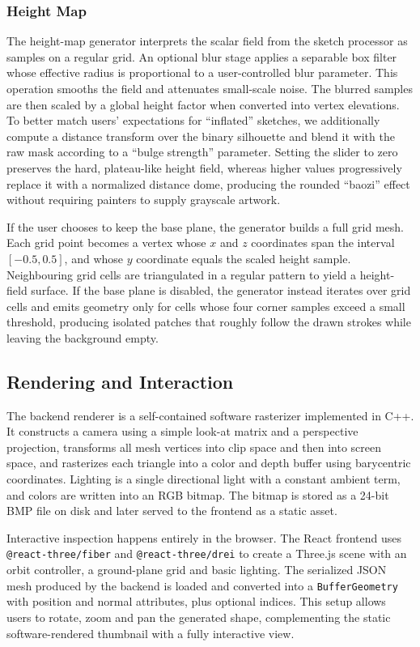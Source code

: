 \documentclass[11pt, a4paper]{article}
\begin{document}
\subsubsection{Height Map}
The height-map generator interprets the scalar field from the sketch processor as samples on a regular grid. An optional blur stage applies a separable box filter whose effective radius is proportional to a user-controlled blur parameter. This operation smooths the field and attenuates small-scale noise. The blurred samples are then scaled by a global height factor when converted into vertex elevations. To better match users' expectations for ``inflated'' sketches, we additionally compute a distance transform over the binary silhouette and blend it with the raw mask according to a ``bulge strength'' parameter. Setting the slider to zero preserves the hard, plateau-like height field, whereas higher values progressively replace it with a normalized distance dome, producing the rounded ``baozi'' effect without requiring painters to supply grayscale artwork.

If the user chooses to keep the base plane, the generator builds a full grid mesh. Each grid point becomes a vertex whose $x$ and $z$ coordinates span the interval $[-0.5, 0.5]$, and whose $y$ coordinate equals the scaled height sample. Neighbouring grid cells are triangulated in a regular pattern to yield a height-field surface. If the base plane is disabled, the generator instead iterates over grid cells and emits geometry only for cells whose four corner samples exceed a small threshold, producing isolated patches that roughly follow the drawn strokes while leaving the background empty.

\subsection{Rendering and Interaction}
The backend renderer is a self-contained software rasterizer implemented in C++. It constructs a camera using a simple look-at matrix and a perspective projection, transforms all mesh vertices into clip space and then into screen space, and rasterizes each triangle into a color and depth buffer using barycentric coordinates. Lighting is a single directional light with a constant ambient term, and colors are written into an RGB bitmap. The bitmap is stored as a 24-bit BMP file on disk and later served to the frontend as a static asset.

Interactive inspection happens entirely in the browser. The React frontend uses \texttt{@react-three/fiber} and \texttt{@react-three/drei} to create a Three.js scene with an orbit controller, a ground-plane grid and basic lighting. The serialized JSON mesh produced by the backend is loaded and converted into a \texttt{BufferGeometry} with position and normal attributes, plus optional indices. This setup allows users to rotate, zoom and pan the generated shape, complementing the static software-rendered thumbnail with a fully interactive view.
\end{document}
